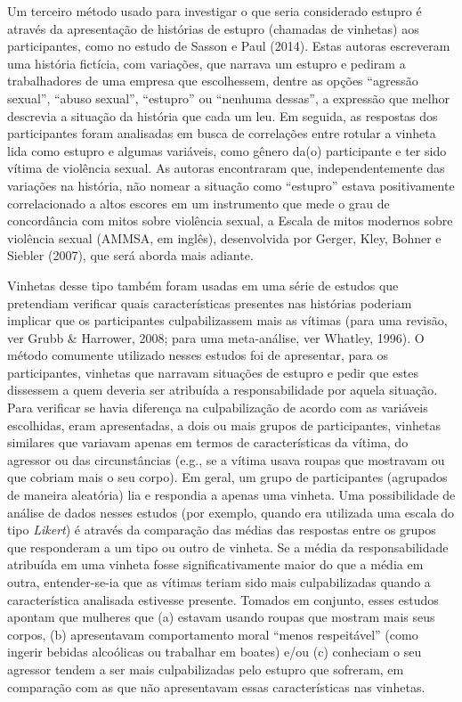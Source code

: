 Um terceiro método usado para investigar o que seria considerado estupro é através da apresentação de histórias de estupro (chamadas de vinhetas) aos participantes, como no estudo de Sasson e Paul (2014). Estas autoras escreveram uma história fictícia, com variações, que narrava um estupro e pediram a trabalhadores de uma empresa que escolhessem, dentre as opções ``agressão sexual'', ``abuso sexual'', ``estupro'' ou ``nenhuma dessas'', a expressão que melhor descrevia a situação da história que cada um leu. Em seguida, as respostas dos participantes foram analisadas em busca de correlações entre rotular a vinheta lida como estupro e algumas variáveis, como gênero da(o) participante e ter sido vítima de violência sexual. As autoras encontraram que, independentemente das variações na história, não nomear a situação como ``estupro'' estava positivamente correlacionado a altos escores em um instrumento que mede o grau de concordância com mitos sobre violência sexual, a Escala de mitos modernos sobre violência sexual (AMMSA, em inglês), desenvolvida por Gerger, Kley, Bohner e Siebler (2007), que será aborda mais adiante.

Vinhetas desse tipo também foram usadas em uma série de estudos que pretendiam verificar quais características presentes nas histórias poderiam implicar que os participantes culpabilizassem mais as vítimas (para uma revisão, ver Grubb \& Harrower, 2008; para uma meta-análise, ver Whatley, 1996). O método comumente utilizado nesses estudos foi de apresentar, para os participantes, vinhetas que narravam situações de estupro e pedir que estes dissessem a quem deveria ser atribuída a responsabilidade por aquela situação. Para verificar se havia diferença na culpabilização de acordo com as variáveis escolhidas, eram apresentadas, a dois ou mais grupos de participantes, vinhetas similares que variavam apenas em termos de características da vítima, do agressor ou das circunstâncias (e.g., se a vítima usava roupas que mostravam ou que cobriam mais o seu corpo). Em geral, um grupo de participantes (agrupados de maneira aleatória) lia e respondia a apenas uma vinheta. Uma possibilidade de análise de dados nesses estudos (por exemplo, quando era utilizada uma escala do tipo \textit{Likert}) é através da comparação das médias das respostas entre os grupos que responderam a um tipo ou outro de vinheta. Se a média da responsabilidade atribuída em uma vinheta fosse significativamente maior do que a média em outra, entender-se-ia que as vítimas teriam sido mais culpabilizadas quando a característica analisada estivesse presente. Tomados em conjunto, esses estudos apontam que mulheres que (a) estavam usando roupas que mostram mais seus corpos, (b) apresentavam comportamento moral ``menos respeitável'' (como ingerir bebidas alcoólicas ou trabalhar em boates) e/ou (c) conheciam o seu agressor tendem a ser mais culpabilizadas pelo estupro que sofreram, em comparação com as que não apresentavam essas características nas vinhetas.


